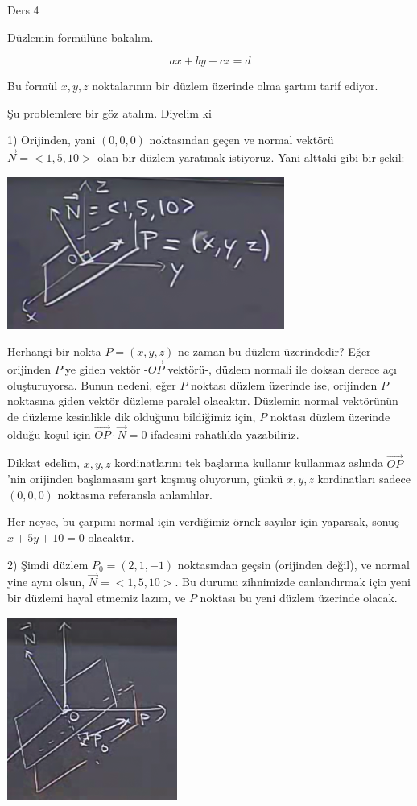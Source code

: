 \documentclass[12pt,fleqn]{article}\usepackage{../../common}
\begin{document}
Ders 4

Düzlemin formülüne bakalım.

$$ ax + by + cz = d $$

Bu formül $x,y,z$ noktalarının bir düzlem üzerinde olma şartını tarif
ediyor. 

Şu problemlere bir göz atalım. Diyelim ki 

1) Orijinden, yani $(0,0,0)$ noktasından geçen ve normal vektörü $\vec{N} =
< 1,5,10 >$ olan bir düzlem yaratmak istiyoruz. Yani alttaki gibi bir şekil:

\includegraphics[height=5cm]{4_1.png}

Herhangi bir nokta $P = (x,y,z)$ ne zaman bu düzlem üzerindedir? Eğer orijinden
$P$'ye giden vektör -$\vec{OP}$ vektörü-, düzlem normali ile doksan derece açı
oluşturuyorsa. Bunun nedeni, eğer $P$ noktası düzlem üzerinde ise, orijinden $P$
noktasına giden vektör düzleme paralel olacaktır. Düzlemin normal vektörünün de
düzleme kesinlikle dik olduğunu bildiğimiz için, $P$ noktası düzlem üzerinde
olduğu koşul için $\vec{OP} \cdot \vec{N} = 0$ ifadesini rahatlıkla yazabiliriz.

Dikkat edelim, $x,y,z$ kordinatlarını tek başlarına kullanır kullanmaz aslında
$\vec{OP}$'nin orijinden başlamasını şart koşmuş oluyorum, çünkü $x,y,z$
kordinatları sadece $(0,0,0)$ noktasına referansla anlamlılar.

Her neyse, bu çarpımı normal için verdiğimiz örnek sayılar için yaparsak,
sonuç $x+5y+10 = 0$ olacaktır.

2) Şimdi düzlem $P_0 = (2,1,-1)$ noktasından geçsin (orijinden değil), ve normal
yine aynı olsun, $\vec{N} = < 1,5,10 >$. Bu durumu zihnimizde canlandırmak için
yeni bir düzlemi hayal etmemiz lazım, ve $P$ noktası bu yeni düzlem üzerinde
olacak.

\includegraphics[height=6cm]{4_2.png}
\end{document}
